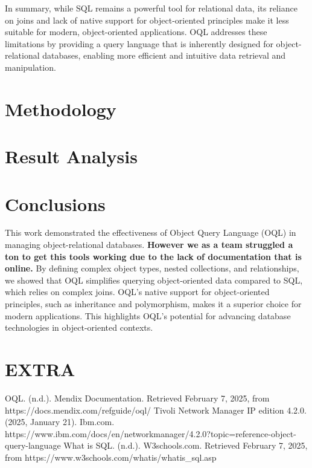 \documentclass{article}
\begin{document}
In summary, while SQL remains a powerful tool for relational data, its reliance on joins and lack of native support for object-oriented principles make it less suitable for modern, object-oriented applications. OQL addresses these limitations by providing a query language that is inherently designed for object-relational databases, enabling more efficient and intuitive data retrieval and manipulation.

\section{Methodology}
\section{Result Analysis}
\section{Conclusions}
This work demonstrated the effectiveness of Object Query Language (OQL) in managing object-relational databases. \textbf{However we as a team struggled a ton to get this tools working due to the lack of documentation that is online.} By defining complex object types, nested collections, and relationships, we showed that OQL simplifies querying object-oriented data compared to SQL, which relies on complex joins. OQL's native support for object-oriented principles, such as inheritance and polymorphism, makes it a superior choice for modern applications. This highlights OQL's potential for advancing database technologies in object-oriented contexts.
\section{EXTRA}
\begin{thebibliography}{9}
	OQL. (n.d.). Mendix Documentation. Retrieved February 7, 2025, from https://docs.mendix.com/refguide/oql/
	Tivoli Network Manager IP edition 4.2.0. (2025, January 21). Ibm.com. https://www.ibm.com/docs/en/networkmanager/4.2.0?topic=reference-object-query-language
	What is SQL. (n.d.). W3schools.com. Retrieved February 7, 2025, from https://www.w3schools.com/whatis/whatis\_sql.asp
\end{thebibliography}
\end{document}
